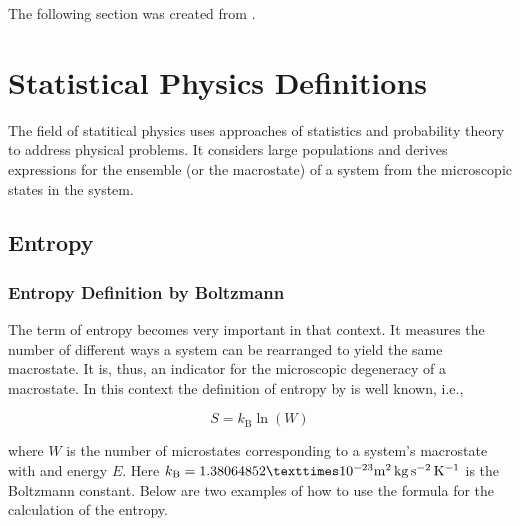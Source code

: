 \documentclass[letterpaper,10pt,english]{sphinxmanual}
\begin{document}
\sphinxAtStartPar
The following section was created from .


\chapter{Statistical Physics Definitions}
\label{\detokenize{notebooks/L2/3_Statistical_Physics_Definitions:Statistical-Physics-Definitions}}\label{\detokenize{notebooks/L2/3_Statistical_Physics_Definitions::doc}}
\sphinxAtStartPar
The field of statitical physics uses approaches of statistics and probability theory to address physical problems. It considers large populations and derives expressions for the ensemble (or the macrostate) of a system from the microscopic states in the system.


\section{Entropy}
\label{\detokenize{notebooks/L2/3_Statistical_Physics_Definitions:Entropy}}

\subsection{Entropy Definition by Boltzmann}
\label{\detokenize{notebooks/L2/3_Statistical_Physics_Definitions:Entropy-Definition-by-Boltzmann}}
\sphinxAtStartPar
The term of entropy becomes very important in that context. It measures the number of different ways a system can be rearranged to yield the same macrostate. It is, thus, an indicator for the microscopic degeneracy of a macrostate. In this context the definition of entropy by  is well known, i.e.,

\sphinxAtStartPar
\begin{equation}
S=k_\mathrm{B} \ln(W)
\end{equation}

\sphinxAtStartPar
where \(W\) is the number of microstates corresponding to a system’s macrostate with and energy \(E\). Here \(k_\mathrm{B}=1.38064852 × 10^{-23} {\rm m^2\, kg\, s^{-2}\, K^{-1}}\) is the Boltzmann constant. Below are two examples of how to use the formula for the calculation of the entropy.
\end{document}
